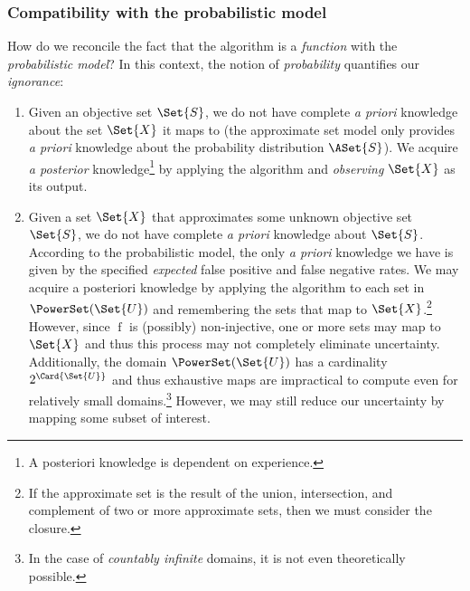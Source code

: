 \documentclass[ ../main.tex]{subfiles}
\begin{document}
\subsubsection{Compatibility with the probabilistic model}
How do we reconcile the fact that the algorithm is a \emph{function} with the 
\emph{probabilistic model}? In this context, the notion of \emph{probability} 
quantifies our \emph{ignorance}:
\begin{enumerate}
\item Given an objective set $\Set{S}$, we do not have complete \emph{a priori} 
knowledge about the set $\Set{X}$ it maps to (the approximate set model only 
provides \emph{a priori} knowledge about the probability distribution 
$\ASet{S}$). We acquire \emph{a posterior} knowledge\footnote{A posteriori 
knowledge is dependent on experience.} by applying the algorithm and 
\emph{observing} $\Set{X}$ as its output.
\item Given a set $\Set{X}$ that approximates some unknown objective set 
$\Set{S}$, we do not have complete \emph{a priori} knowledge about $\Set{S}$. 
According to the probabilistic model, the only \emph{a priori} knowledge we have 
is given by the specified \emph{expected} false positive and false negative 
rates. We may acquire a posteriori knowledge by applying the algorithm to each 
set in $\PowerSet(\Set{U})$ and remembering the sets that map to 
$\Set{X}$.\footnote{If the approximate set is the result of the union, 
intersection, and complement of two or more approximate sets, then we must 
consider the closure.}
However, since $\operatorname{f}$ is (possibly) non-injective, one or more sets 
may map to $\Set{X}$ and thus this process may not completely eliminate 
uncertainty. Additionally, the domain $\PowerSet(\Set{U})$ has a cardinality
$2^{\Card{\Set{U}}}$ and thus exhaustive maps are impractical to compute even 
for relatively small domains.\footnote{In the case of \emph{countably infinite} 
domains, it is not even theoretically possible.} However, we may still reduce 
our uncertainty by mapping some subset of interest.
\end{enumerate}
\end{document}
